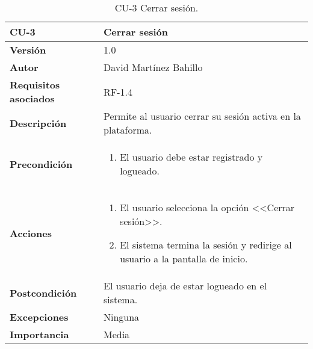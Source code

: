 \begin{table}[p]
	\centering
	\begin{tabularx}{\linewidth}{ p{} p{} }
		\toprule
		\textbf{CU-3}    & \textbf{Cerrar sesión}\\
		\midrule
		\textbf{Versión}              & 1.0    \\
		\textbf{Autor}                & David Martínez Bahillo \\
		\textbf{Requisitos asociados} & RF-1.4 \\
		\textbf{Descripción}          & Permite al usuario cerrar su sesión activa en la plataforma. \\
		\textbf{Precondición}         &  
		\begin{enumerate}
			\def\labelenumi{\arabic{enumi}.}
			\tightlist
			\item El usuario debe estar registrado y logueado.
		\end{enumerate}\\
		\textbf{Acciones}             &
		\begin{enumerate}
			\def\labelenumi{\arabic{enumi}.}
			\tightlist
			\item El usuario selecciona la opción <<Cerrar sesión>>.
			\item El sistema termina la sesión y redirige al usuario a la pantalla de inicio.
		\end{enumerate}\\
		\textbf{Postcondición}        & El usuario deja de estar logueado en el sistema. \\
		\textbf{Excepciones}          & Ninguna \\
		\textbf{Importancia}          & Media  \\
		\bottomrule
	\end{tabularx}
	\caption{CU-3 Cerrar sesión.}
\end{table}



